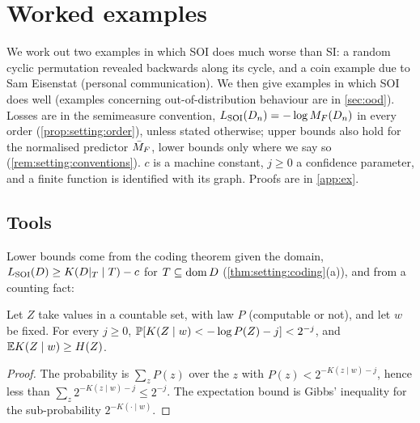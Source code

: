 \section{Worked examples}\label{sec:ex}

We work out two examples in which SOI does much worse than SI: a random cyclic permutation revealed backwards along its cycle, and a coin example due to Sam Eisenstat (personal communication). We then give examples in which SOI does well (examples concerning out-of-distribution behaviour are in \cref{sec:ood}). Losses are in the semimeasure convention, $L_{\mathrm{SOI}}(D_n)=-\log M_{F}(D_n)$ in every order (\cref{prop:setting:order}), unless stated otherwise; upper bounds also hold for the normalised predictor $\bar{M}_{F}$, lower bounds only where we say so (\cref{rem:setting:conventions}). $c$ is a machine constant, $j\ge0$ a confidence parameter, and a finite function is identified with its graph. Proofs are in \cref{app:ex}.

\subsection{Tools}\label{sec:ex:tools}

Lower bounds come from the coding theorem given the domain, $L_{\mathrm{SOI}}(D)\ge K(D|_T\mid T)-c$ for $T\subseteq\operatorname{dom} D$ (\cref{thm:setting:coding}(a)), and from a counting fact:

\begin{lemma}\label{lem:ex:surprisal}
Let $Z$ take values in a countable set, with law $P$ (computable or not), and let $w$ be fixed. For every $j\ge0$, $\mathbb{P}[K(Z\mid w)<-\log P(Z)-j]<2^{-j}$, and $\mathbb{E} K(Z\mid w)\ge H(Z)$.
\end{lemma}

\begin{proof}
The probability is $\sum_zP(z)$ over the $z$ with $P(z)<2^{-K(z\mid w)-j}$, hence less than $\sum_z2^{-K(z\mid w)-j}\le2^{-j}$. The expectation bound is Gibbs' inequality for the sub-probability $2^{-K(\cdot\mid w)}$.
\end{proof}

